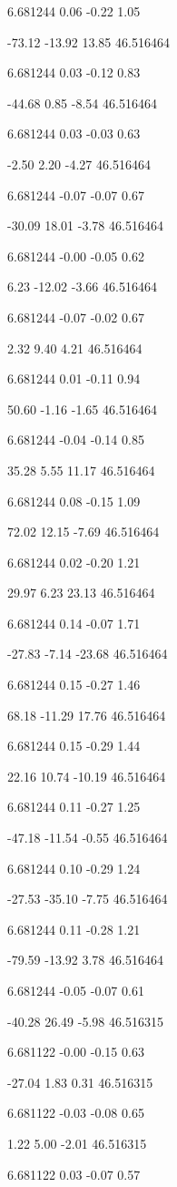 6.681244
0.06
-0.22
1.05

-73.12
-13.92
13.85
46.516464

6.681244
0.03
-0.12
0.83

-44.68
0.85
-8.54
46.516464

6.681244
0.03
-0.03
0.63

-2.50
2.20
-4.27
46.516464

6.681244
-0.07
-0.07
0.67

-30.09
18.01
-3.78
46.516464

6.681244
-0.00
-0.05
0.62

6.23
-12.02
-3.66
46.516464

6.681244
-0.07
-0.02
0.67

2.32
9.40
4.21
46.516464

6.681244
0.01
-0.11
0.94

50.60
-1.16
-1.65
46.516464

6.681244
-0.04
-0.14
0.85

35.28
5.55
11.17
46.516464

6.681244
0.08
-0.15
1.09

72.02
12.15
-7.69
46.516464

6.681244
0.02
-0.20
1.21

29.97
6.23
23.13
46.516464

6.681244
0.14
-0.07
1.71

-27.83
-7.14
-23.68
46.516464

6.681244
0.15
-0.27
1.46

68.18
-11.29
17.76
46.516464

6.681244
0.15
-0.29
1.44

22.16
10.74
-10.19
46.516464

6.681244
0.11
-0.27
1.25

-47.18
-11.54
-0.55
46.516464

6.681244
0.10
-0.29
1.24

-27.53
-35.10
-7.75
46.516464

6.681244
0.11
-0.28
1.21

-79.59
-13.92
3.78
46.516464

6.681244
-0.05
-0.07
0.61

-40.28
26.49
-5.98
46.516315

6.681122
-0.00
-0.15
0.63

-27.04
1.83
0.31
46.516315

6.681122
-0.03
-0.08
0.65

1.22
5.00
-2.01
46.516315

6.681122
0.03
-0.07
0.57

